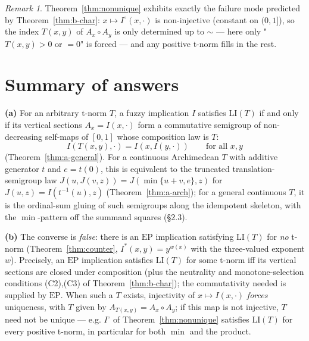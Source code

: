 \documentclass{amsart}
\theoremstyle{definition}
\theoremstyle{remark}
\newtheorem{remark}{Remark}
\newcommand{\zo}{[0,1]}
\newcommand{\LI}{\mathrm{LI}}
\newcommand{\EP}{\mathrm{EP}}
\newcommand{\Ax}{A}
\begin{document}
\begin{remark}
Theorem~\ref{thm:nonunique} exhibits exactly the failure mode predicted by
Theorem~\ref{thm:b-char}: $x\mapsto I^{\circ}(x,\cdot)$ is non-injective (constant on
$(0,1]$), so the index $T(x,y)$ of $\Ax_x\circ\Ax_y$ is only determined up to $\sim$ --- here
only "$T(x,y)>0$ or $=0$" is forced --- and any positive t-norm fills in the rest.
\end{remark}

\section{Summary of answers}

\textbf{(a)} For an arbitrary t-norm $T$, a fuzzy implication $I$ satisfies $\LI(T)$ if and
only if its vertical sections $\Ax_x=I(x,\cdot)$ form a commutative semigroup of
non-decreasing self-maps of $\zo$ whose composition law is $T$:
\[
I(T(x,y),\cdot)=I(x,I(y,\cdot))\qquad\text{for all }x,y
\]
(Theorem~\ref{thm:a-general}). For a continuous Archimedean $T$ with additive generator $t$
and $e=t(0)$, this is equivalent to the truncated translation-semigroup law
$J(u,J(v,z))=J(\min\{u+v,e\},z)$ for $J(u,z)=I(t^{-1}(u),z)$ (Theorem~\ref{thm:a-arch}); for a
general continuous $T$, it is the ordinal-sum gluing of such semigroups along the idempotent
skeleton, with the $\min$-pattern off the summand squares (\S2.3).

\textbf{(b)} The converse is \emph{false}: there is an $\EP$ implication satisfying $\LI(T)$
for \emph{no} t-norm (Theorem~\ref{thm:counter}, $I^{\ast}(x,y)=y^{w(x)}$ with the three-valued
exponent $w$). Precisely, an $\EP$ implication satisfies $\LI(T)$ for some t-norm iff its
vertical sections are closed under composition (plus the neutrality and monotone-selection
conditions (C2),(C3) of Theorem~\ref{thm:b-char}); the commutativity needed is supplied by
$\EP$. When such a $T$ exists, injectivity of $x\mapsto I(x,\cdot)$ \emph{forces} uniqueness, with
$T$ given by $\Ax_{T(x,y)}=\Ax_x\circ\Ax_y$; if this map is not injective,
$T$ need not be unique --- e.g. $I^{\circ}$ of Theorem~\ref{thm:nonunique} satisfies $\LI(T)$
for every positive t-norm, in particular for both $\min$ and the product.
\end{document}
